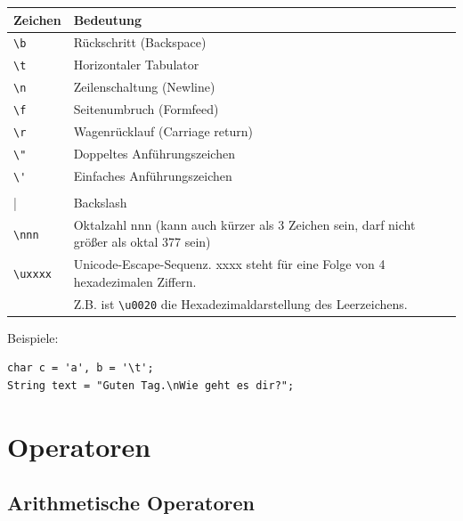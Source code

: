\begin{description}
\begin{tabular}{|l|l|}\hline
\textbf{Zeichen} & \textbf{Bedeutung} \\ \hline
{\lstinline|\b|} & Rückschritt (Backspace) \\ \hline
{\lstinline|\t|} & Horizontaler Tabulator \\ \hline
{\lstinline|\n|} & Zeilenschaltung (Newline) \\ \hline
{\lstinline|\f|} & Seitenumbruch (Formfeed) \\ \hline
{\lstinline|\r|} & Wagenrücklauf (Carriage return) \\ \hline
{\lstinline|\"|} & Doppeltes Anführungszeichen \\ \hline
{\lstinline|\'|} & Einfaches Anführungszeichen \\ \hline
{\lstinline|\\|} & Backslash \\ \hline
{\lstinline|\nnn|} & Oktalzahl nnn (kann auch kürzer als 3 Zeichen sein, darf
nicht größer als oktal 377 sein) \\ \hline 
{\lstinline|\uxxxx|} & Unicode-Escape-Sequenz. xxxx steht für eine Folge von 4
hexadezimalen Ziffern.\\
& Z.B. ist {\lstinline|\u0020|} die Hexadezimaldarstellung des Leerzeichens. 
\\ \hline
\end{tabular}

Beispiele:

\begin{lstlisting}
char c = 'a', b = '\t';
String text = "Guten Tag.\nWie geht es dir?";
\end{lstlisting}
\end{description}


\section{Operatoren}

\subsection{Arithmetische Operatoren}

